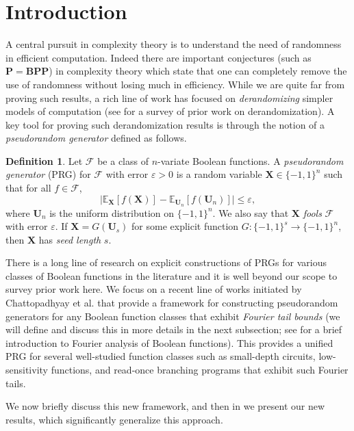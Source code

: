 \documentclass[10pt,a4paper]{article}
\newcommand{\eps}{\varepsilon}
\theoremstyle{definition}
\newtheorem{definition}[theorem]{Definition}
\begin{document}
\section{Introduction}
A central pursuit in complexity theory is to understand the need of randomness in efficient computation. Indeed there are important conjectures (such as $\mathbf{P}=\mathbf{BPP}$) in complexity theory which state that one can completely remove the use of randomness without losing much in efficiency. While we are quite far from proving such results, a rich line of work has focused on \emph{derandomizing} simpler models of computation (see \cite{vadhan2012pseudorandomness} for a survey of prior work on derandomization). A key tool for proving such derandomization results is through the notion of a \emph{pseudorandom generator} defined as follows.
\begin{definition}\label{def:prg}
Let $\mathcal{F}$ be a class of $n$-variate Boolean functions. A \emph{pseudorandom generator} (PRG) for $\mathcal{F}$ with error $\eps>0$ is a random variable $\mathbf{X}\in \{-1,1\}^n$ such that for all $f\in \mathcal{F}$,
\begin{equation*}
    \bigl| \mathbb{E}_{\mathbf{X}}[f(\mathbf{X})]-\mathbb{E}_{\mathbf{U}_n}[f(\mathbf{U}_n)] \bigr| \leq \eps,
\end{equation*}
where $\mathbf{U}_n$ is the uniform distribution on $\{-1,1\}^n$.  We also say that $\mathbf{X}$ \emph{fools} $\mathcal{F}$ with error $\eps$.  If $\mathbf{X}=G(\mathbf{U}_s)$ for some explicit function $G:\{-1,1\}^s\to \{-1,1\}^n$, then $\mathbf{X}$ has \emph{seed length} $s$.
\end{definition} 
There is a long line of research on explicit constructions of PRGs for various classes of Boolean functions in the literature and it is well beyond our scope to survey prior work here. We focus on a recent line of works initiated by Chattopadhyay {et al.} \cite{CHHL, CHLT} that provide a framework for constructing pseudorandom generators for any Boolean function classes that exhibit \emph{Fourier tail bounds} (we will define and discuss this in more details in the next subsection; see  for a brief introduction to Fourier analysis of Boolean functions). This provides a unified PRG for several well-studied function classes such as small-depth circuits, low-sensitivity functions, and read-once branching programs that exhibit such Fourier tails.

We now briefly discuss this new framework, and then in  we present our new results,  which significantly generalize this approach.
\end{document}
